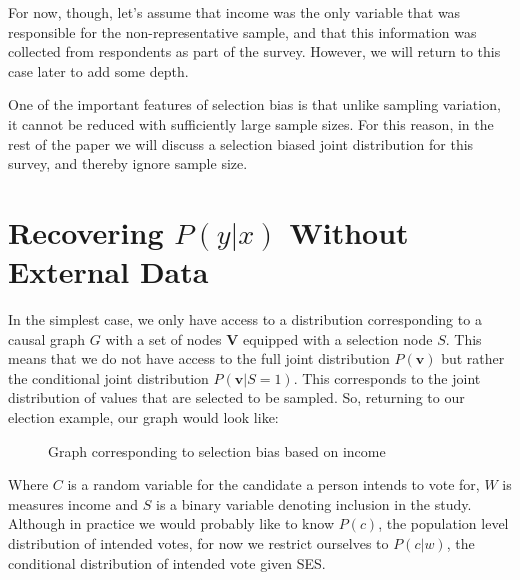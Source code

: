 \documentclass[12pt,twoside]{reedthesis}
\theoremstyle{definition}
\begin{document}
For now, though, let's assume that income was the only variable that was responsible for the non-representative sample, and that this information was collected from respondents as part of the survey. However, we will return to this case later to add some depth.

One of the important features of selection bias is that unlike sampling variation, it cannot be reduced with sufficiently large sample sizes. For this reason, in the rest of the paper we will discuss a selection biased joint distribution for this survey, and thereby ignore sample size.

\section{Recovering $P(y|x)$ Without External Data}
In the simplest case, we only have access to a distribution corresponding to a causal graph $G$  with a set of nodes $\mathbf{V}$ equipped with a selection node $S$. This means that we do not have access to the full joint distribution $P(\mathbf{v})$ but rather the conditional joint distribution $P(\mathbf{v} | S = 1)$. This corresponds to the joint distribution of values that are selected to be sampled. So, returning to our election example, our graph would look like:
\begin{figure}
\begin{center}
\end{center}
\caption{Graph corresponding to selection bias based on income} \label{fig:2.1}
\end{figure}
Where $C$ is a random variable for the candidate a person intends to vote for, $W$ is measures income and $S$ is a binary variable denoting inclusion in the study. Although in practice we would probably like to know $P(c)$, the population level distribution of intended votes, for now we restrict ourselves to $P(c | w)$, the conditional distribution of intended vote given SES. 
\end{document}
